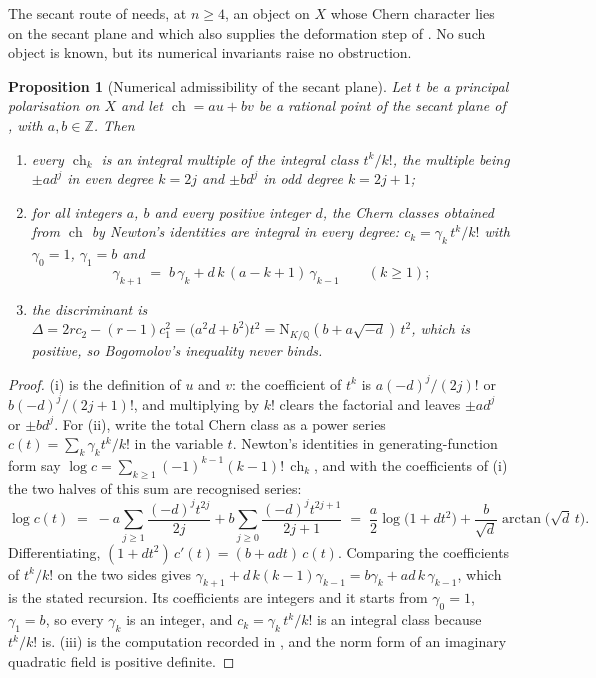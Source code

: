 \documentclass[11pt,reqno]{amsart}
\theoremstyle{plain}
\newtheorem{proposition}[theorem]{Proposition}
\theoremstyle{definition}
\theoremstyle{remark}
\newcommand{\QQ}{\mathbb{Q}}
\newcommand{\ZZ}{\mathbb{Z}}
\newcommand{\Nm}{\mathrm{N}}             %
\DeclareMathOperator{\ch}{ch}
\begin{document}
The secant route of  needs, at $n\ge4$, an object on
$X$ whose Chern character lies on the secant plane and which also supplies the
deformation step of . No such object is known, but its
numerical invariants raise no obstruction.

\begin{proposition}[Numerical admissibility of the secant plane]%
\label{prop:notforbidden}
Let $t$ be a principal polarisation on $X$ and let
$\ch=au+bv$ be a rational point of the secant plane of ,
with $a,b\in\ZZ$. Then
\begin{enumerate}[label=\textup{(\roman*)},nosep]
\item every $\ch_{k}$ is an integral multiple of the integral class
  $t^{k}/k!$, the multiple being $\pm a d^{j}$ in even degree $k=2j$ and
  $\pm b d^{j}$ in odd degree $k=2j+1$;
\item for all integers $a$, $b$ and every positive integer $d$, the Chern
  classes obtained from $\ch$ by Newton's identities are integral in every
  degree: $c_{k}=\gamma_{k}\,t^{k}/k!$ with $\gamma_{0}=1$, $\gamma_{1}=b$ and
  \[
    \gamma_{k+1}\;=\;b\,\gamma_{k}+d\,k\,(a-k+1)\,\gamma_{k-1}\qquad(k\ge1);
  \]
\item the discriminant is
  $\Delta=2rc_{2}-(r-1)c_{1}^{2}=\bigl(a^{2}d+b^{2}\bigr)t^{2}
  =\Nm_{K/\QQ}(b+a\sqrt{-d})\,t^{2}$, which is positive, so Bogomolov's
  inequality never binds.
\end{enumerate}
\end{proposition}

\begin{proof}
(i) is the definition of $u$ and $v$: the coefficient of $t^{k}$ is
$a(-d)^{j}/(2j)!$ or $b(-d)^{j}/(2j+1)!$, and multiplying by $k!$ clears the
factorial and leaves $\pm ad^{j}$ or $\pm bd^{j}$. For (ii), write the total
Chern class as a power series $c(t)=\sum_{k}\gamma_{k}t^{k}/k!$ in the
variable $t$. Newton's identities in generating-function form say
$\log c=\sum_{k\ge1}(-1)^{k-1}(k-1)!\,\ch_{k}$, and with the coefficients of
(i) the two halves of this sum are recognised series:
\[
  \log c(t)\;=\;-a\sum_{j\ge1}\frac{(-d)^{j}t^{2j}}{2j}
     +b\sum_{j\ge0}\frac{(-d)^{j}t^{2j+1}}{2j+1}
  \;=\;\frac{a}{2}\log\bigl(1+dt^{2}\bigr)
     +\frac{b}{\sqrt{d}}\arctan\bigl(\sqrt{d}\,t\bigr).
\]
Differentiating, $(1+dt^{2})\,c'(t)=(b+adt)\,c(t)$. Comparing the
coefficients of $t^{k}/k!$ on the two sides gives
$\gamma_{k+1}+d\,k(k-1)\gamma_{k-1}=b\gamma_{k}+ad\,k\,\gamma_{k-1}$, which is
the stated recursion. Its coefficients are integers and it starts from
$\gamma_{0}=1$, $\gamma_{1}=b$, so every $\gamma_{k}$ is an integer, and
$c_{k}=\gamma_{k}\,t^{k}/k!$ is an integral class because $t^{k}/k!$ is. (iii) is the computation recorded in
, and the norm form of an imaginary quadratic field
is positive definite.
\end{proof}
\end{document}
